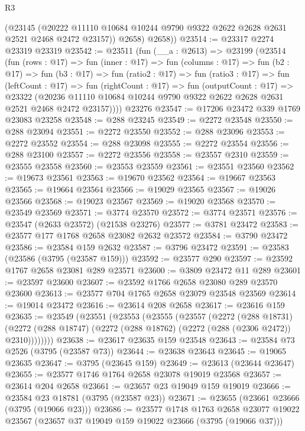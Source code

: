 \begin{lexlean}{R3}
\begin{coremodule}
          (@23145
            (@20222 @11110 @10684 @10244 @9790 @9322 @2622 @2628 @2631 @2521 @2468 @2472 @23157))
          @2658)
        @2658))
@23514 := @23317 @2274 @23319 @23319
@23542 := @23511
    (fun (__a : @2613) =>
    @23199
      (@23514
        (fun (rows : @17) =>
        fun (inner : @17) =>
        fun (columns : @17) =>
        fun (b2 : @17) =>
        fun (b3 : @17) =>
        fun (ratio2 : @17) =>
        fun (ratio3 : @17) =>
        fun (leftCount : @17) =>
        fun (rightCount : @17) =>
        fun (outputCount : @17) =>
        @23322
          (@20236 @11110 @10684 @10244 @9790 @9322 @2622 @2628 @2631 @2521 @2468 @2472 @23157))))
    @23276
@23547 := @17206 @23472 @339 @1769 @23083 @23258
@23548 := @288 @23245
@23549 := @2272 @23548
@23550 := @288 @23094
@23551 := @2272 @23550
@23552 := @288 @23096
@23553 := @2272 @23552
@23554 := @288 @23098
@23555 := @2272 @23554
@23556 := @288 @23100
@23557 := @2272 @23556
@23558 := @23557 @2310
@23559 := @23555 @23558
@23560 := @23553 @23559
@23561 := @23551 @23560
@23562 := @19673 @23561
@23563 := @19670 @23562
@23564 := @19667 @23563
@23565 := @19664 @23564
@23566 := @19029 @23565
@23567 := @19026 @23566
@23568 := @19023 @23567
@23569 := @19020 @23568
@23570 := @23549 @23569
@23571 := @3774 @23570
@23572 := @3774 @23571
@23576 := @23547 (@2633 @23572) (@21538 @23276)
@23577 := @3781 @23472
@23583 := @23577 @177 @1768 @2658 @23082 @2632 @23572
@23584 := @3790 @23472
@23586 := @23584 @159 @2632
@23587 := @3796 @23472
@23591 := @23583 (@23586 (@3795 (@23587 @159)))
@23592 := @23577 @290
@23597 := @23592 @1767 @2658 @23081 @289 @23571
@23600 := @3809 @23472 @11 @289
@23601 := @23597 @23600
@23607 := @23592 @1766 @2658 @23080 @289 @23570 @23600
@23613 := @23577 @704 @1765 @2658 @23079 @23548 @23569
@23614 := @19014 @23472
@23616 := @23614 @208 @2658
@23617 := @23616 @159
@23635 := @23549
    (@23551
      (@23553
        (@23555
          (@23557
            (@2272
              (@288 @18731)
              (@2272 (@288 @18747) (@2272 (@288 @18762) (@2272 (@288 (@2306 @2472)) @2310))))))))
@23638 := @23617 @23635 @159 @23548
@23643 := @23584 @73 @2526 (@3795 (@23587 @73))
@23644 := @23638 @23643
@23645 := @19065 @23635
@23647 := @3795 (@23645 @159)
@23649 := @23613 (@23644 @23647)
@23655 := @23577 @1746 @1764 @2658 @23078 @19019 @23568
@23657 := @23614 @204 @2658
@23661 := @23657 @23 @19049 @159 @19019
@23666 := @23584 @23 @18781 (@3795 (@23587 @23))
@23671 := @23655 (@23661 @23666 (@3795 (@19066 @23)))
@23686 := @23577
    @1748
    @1763
    @2658
    @23077
    @19022
    @23567
    (@23657 @37 @19049 @159 @19022 @23666 (@3795 (@19066 @37)))

\end{coremodule}
\end{lexlean}
